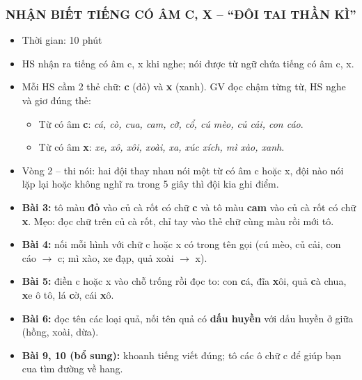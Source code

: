\documentclass[../main.tex]{subfiles}
\begin{document}
\subsubsection{NHẬN BIẾT TIẾNG CÓ ÂM C, X -- “ĐÔI TAI THẦN KÌ”}
\begin{hd}
    \begin{itemize}
        \item Thời gian: 10 phút
        \item HS nhận ra tiếng có âm c, x khi nghe; nói được từ ngữ chứa tiếng có âm c, x.
    \end{itemize}
\end{hd}
\begin{itemize}
    \item Mỗi HS cầm 2 thẻ chữ: \textbf{c} (đỏ) và \textbf{x} (xanh). GV đọc chậm từng từ, HS nghe và giơ đúng thẻ:
    \begin{itemize}
        \item[--] Từ có âm \textbf{c}: \textit{cá, cò, cua, cam, cờ, cổ, cú mèo, củ cải, con cáo}.
        \item[--] Từ có âm \textbf{x}: \textit{xe, xô, xôi, xoài, xa, xúc xích, mì xào, xanh}.
    \end{itemize}
    \item Vòng 2 -- thi nói: hai đội thay nhau nói một từ có âm c hoặc x, đội nào nói lặp lại hoặc không nghĩ ra trong 5 giây thì đội kia ghi điểm.
\end{itemize}
\begin{itemize}
    \item \textbf{Bài 3:} tô màu \textbf{đỏ} vào củ cà rốt có chữ \textbf{c} và tô màu \textbf{cam} vào củ cà rốt có chữ \textbf{x}. Mẹo: đọc chữ trên củ cà rốt, chỉ tay vào thẻ chữ cùng màu rồi mới tô.
    \item \textbf{Bài 4:} nối mỗi hình với chữ c hoặc x có trong tên gọi (cú mèo, củ cải, con cáo $\to$ c; mì xào, xe đạp, quả xoài $\to$ x).
    \item \textbf{Bài 5:} điền c hoặc x vào chỗ trống rồi đọc to: con \textbf{c}á, đĩa \textbf{x}ôi, quả \textbf{c}à chua, \textbf{x}e ô tô, lá \textbf{c}ờ, cái \textbf{x}ô.
    \item \textbf{Bài 6:} đọc tên các loại quả, nối tên quả có \textbf{dấu huyền} với dấu huyền ở giữa (hồng, xoài, dừa).
    \item \textbf{Bài 9, 10 (bổ sung):} khoanh tiếng viết đúng; tô các ô chữ c để giúp bạn cua tìm đường về hang.
\end{itemize}
\end{document}
